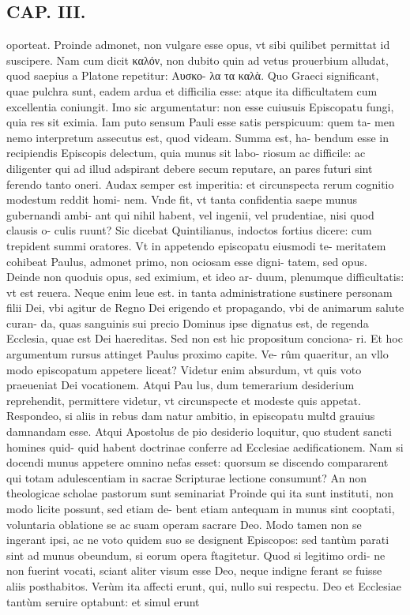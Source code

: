 \documentclass{article}
\begin{document}
\begin{pages}
\section*{CAP. III. }
\marginpar{[ p.31 ]}\pstart oporteat. Proinde admonet, non vulgare esse opus, vt sibi quilibet permittat id suscipere. Nam cum dicit καλόν, non dubito quin ad vetus prouerbium alludat, quod saepius a Platone repetitur: Αυσκο- λα τα καλὰ. Quo Graeci significant, quae pulchra sunt, eadem ardua et difficilia esse: atque ita difficultatem cum excellentia coniungit. Imo sic argumentatur: non esse cuiusuis Episcopatu fungi, quia res sit eximia. Iam puto sensum Pauli esse satis perspicuum: quem ta- men nemo interpretum assecutus est, quod videam. Summa est, ha- bendum esse in recipiendis Episcopis delectum, quia munus sit labo- riosum ac difficile: ac diligenter qui ad illud adspirant debere secum reputare, an pares futuri sint ferendo tanto oneri. Audax semper est imperitia: et circunspecta rerum cognitio modestum reddit homi- nem. Vnde fit, vt tanta confidentia saepe munus gubernandi ambi- ant qui nihil habent, vel ingenii, vel prudentiae, nisi quod clausis o- culis ruunt? Sic dicebat Quintilianus, indoctos fortius dicere: cum trepident summi oratores. Vt in appetendo episcopatu eiusmodi te- meritatem cohibeat Paulus, admonet primo, non ociosam esse digni- tatem, sed opus. Deinde non quoduis opus, sed eximium, et ideo ar- duum, plenumque difficultatis: vt est reuera. Neque enim leue est. in tanta administratione sustinere personam filii Dei, vbi agitur de Regno Dei erigendo et propagando, vbi de animarum salute curan- da, quas sanguinis sui precio Dominus ipse dignatus est, de regenda Ecclesia, quae est Dei haereditas. Sed non est hic propositum conciona- ri. Et hoc argumentum rursus attinget Paulus proximo capite. Ve- rûm quaeritur, an vllo modo episcopatum appetere liceat? Videtur enim absurdum, vt quis voto praeueniat Dei vocationem. Atqui Pau lus, dum temerarium desiderium reprehendit, permittere videtur, vt circunspecte et modeste quis appetat. Respondeo, si aliis in rebus dam natur ambitio, in episcopatu multd grauius damnandam esse. Atqui Apostolus de pio desiderio loquitur, quo student sancti homines quid- quid habent doctrinae conferre ad Ecclesiae aedificationem. Nam si docendi munus appetere omnino nefas esset: quorsum se discendo compararent qui totam adulescentiam in sacrae Scripturae lectione consumunt? An non theologicae scholae pastorum sunt seminariat Proinde qui ita sunt instituti, non modo licite possunt, sed etiam de- bent etiam antequam in munus sint cooptati, voluntaria oblatione se ac suam operam sacrare Deo. Modo tamen non se ingerant ipsi, ac ne voto quidem suo se designent Episcopos: sed tantùm parati sint ad munus obeundum, si eorum opera ftagitetur. Quod si legitimo ordi- ne non fuerint vocati, sciant aliter visum esse Deo, neque indigne ferant se fuisse aliis posthabitos. Verùm ita affecti erunt, qui, nullo sui respectu. Deo et Ecclesiae tantùm seruire optabunt: et simul erunt  \pend

\end{pages}
\end{document}
